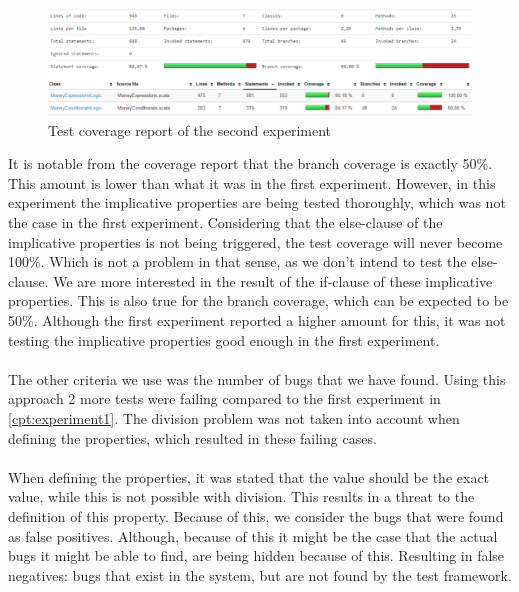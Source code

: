 \begin{figure}[!ht]
	\includegraphics[width=\linewidth]{figures/eval_e2}
\caption{Test coverage report of the second experiment}
\label{fig:experiment2_eval_e2}
\centering
\end{figure}
\FloatBarrier\noindent
It is notable from the coverage report that the branch coverage is exactly 50\%. This amount is lower than what it was in the first experiment. However, in this experiment the implicative properties are being tested thoroughly, which was not the case in the first experiment. Considering that the
else-clause of the implicative properties is not being triggered, the test
coverage will never become 100\%. Which is not a problem in that sense, as we
don't intend to test the else-clause. We are more interested in the result of
the if-clause of these implicative properties. This is also true for the branch coverage, which can be expected to be 50\%. Although the first experiment reported a higher amount for this, it was not testing the implicative properties good enough in the first experiment.\\
\\
The other criteria we use was the number of bugs that we have found. Using this
approach 2 more tests were failing compared to the first experiment in
\autoref{cpt:experiment1}. The division problem was not taken into account when
defining the properties, which resulted in these failing cases.\\
\\
When defining the properties, it was stated that the value should be the exact
value, while this is not possible with division. This results in a threat to the
definition of this property. Because of this, we consider the bugs that were
found as false positives. Although, because of this it might be the case that
the actual bugs it might be able to find, are being hidden because of this.
Resulting in false negatives: bugs that exist in the system, but are not found
by the test framework.

